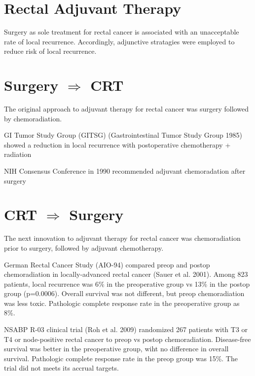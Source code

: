 \documentclass[
  letterpaper,
]{scrbook}
\begin{document}
\section{Rectal Adjuvant Therapy}\label{rectal-adjuvant-therapy}

Surgery as sole treatment for rectal cancer is associated with an
unacceptable rate of local recurrence. Accordingly, adjunctive
stratagies were employed to reduce risk of local recurrence.

\section{\texorpdfstring{Surgery \(\Rightarrow\)
CRT}{Surgery \textbackslash Rightarrow CRT}}\label{surgery-rightarrow-crt}

The original approach to adjuvant therapy for rectal cancer was surgery
followed by chemoradiation.

GI Tumor Study Group (GITSG) (Gastrointestinal Tumor Study Group 1985)
showed a reduction in local recurrence with postoperative chemotherapy +
radiation

NIH Consensus Conference in 1990 recommended adjuvant chemoradation
after surgery

\section{\texorpdfstring{CRT \(\Rightarrow\)
Surgery}{CRT \textbackslash Rightarrow Surgery}}\label{crt-rightarrow-surgery}

The next innovation to adjuvant therapy for rectal cancer was
chemoradiation prior to surgery, followed by adjuvant chemotherapy.

German Rectal Cancer Study (AIO-94) compared preop and postop
chemoradiation in locally-advanced rectal cancer (Sauer et al. 2001).
Among 823 patients, local recurrence was 6\% in the preoperative group
vs 13\% in the postop group (p=0.0006). Overall survival was not
different, but preop chemoradiation was less toxic. Pathologic complete
response rate in the preoperative group as 8\%.

NSABP R-03 clinical trial (Roh et al. 2009) randomized 267 patients with
T3 or T4 or node-positive rectal cancer to preop vs postop
chemoradiation. Disease-free survival was better in the preoperative
group, wiht no difference in overall survival. Pathologic complete
response rate in the preop group was 15\%. The trial did not meets its
accrual targets.
\end{document}
